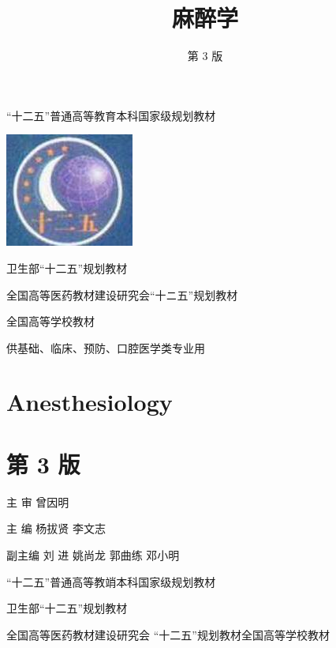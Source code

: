 \documentclass[10pt]{article}
\title{麻醉学 }
\author{第 3 版}
\date{}
\begin{document}
\maketitle
“十二五”普通高等教育本科国家级规划教材

\begin{center}
\includegraphics[max width=\textwidth]{2024_07_09_002a177993bd97d1d6d7g-001}
\end{center}

卫生部“十二五”规划教材

全国高等医药教材建设研究会“十ニ五”规划教材

全国高等学校教材

供基础、临床、预防、口腔医学类专业用

\section*{Anesthesiology}
\section*{第 3 版}
主 审 曾因明

主 编 杨拔贤 李文志

副主编 刘 进 姚尚龙 郭曲练 邓小明

“十二五”普通高等教䇌本科国家级规划教材

卫生部“十二五”规划教材

全国高等医药教材建设研究会 “十二五”规划教材全国高等学校教材
\end{document}

